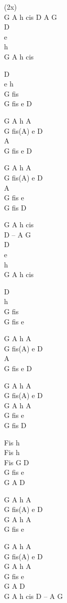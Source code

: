 \begin{chord}
(2x)\\
G A h cis D A G\\
D\\
e\\
h\\
G A h cis

D\\
e h\\
G fis\\
G fis e D

\OneColVin G A h A\\
\OneColVin G fis(A) e D\\
\OneColVin A\\
\OneColVin G fis e D

\OneColVin G A h A\\
\OneColVin G fis(A) e D\\
\OneColVin A\\
\OneColVin G fis e\\
\OneColVin G fis D

G A h cis\ifOneCol \else \\ \fi D – A G\\
D\\
e\\
h\\
G A h cis

D\\
h\\
G fis\\
G fis e

\OneColVin G A h A\\
\OneColVin G fis(A) e D\\
\OneColVin A\\
\OneColVin G fis e D

\OneColVin G A h A\\
\OneColVin G fis(A) e D\\
\OneColVin G A h A\\
\OneColVin G fis e\\
\OneColVin G fis D

Fis h\\
Fis h\\
Fis G D\\
G fis e\\
G A D

\OneColVin G A h A\\
\OneColVin G fis(A) e D\\
\OneColVin G A h A\\
\OneColVin G fis e

\OneColVin G A h A\\
\OneColVin G fis(A) e D\\
\OneColVin G A h A\\
\OneColVin G fis e\\
\OneColVin G A D\\
G A h cis D – A G
\end{chord}
